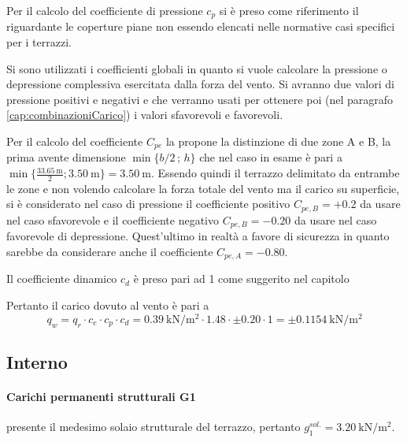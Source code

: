 Per il calcolo del coefficiente di pressione $c_p$ si è preso come riferimento il  riguardante le coperture piane non essendo elencati nelle normative casi specifici per i terrazzi.

Si sono utilizzati i coefficienti globali in quanto si vuole calcolare la pressione o depressione complessiva esercitata dalla forza del vento. 
Si avranno due valori di pressione positivi e negativi e che verranno usati per ottenere poi (nel paragrafo \ref{cap:combinazioniCarico}) i valori sfavorevoli e favorevoli.

Per il calcolo del coefficiente $C_{pe}$ la  propone la distinzione di due zone A e B, la prima avente dimensione $\min\{ b/2\,;\,h\}$ che nel caso in esame è pari a $\min\{\frac{\SI{33.65}{\meter}}{2};\SI{3.50}{\meter}\}=\SI{3.50}{\meter}$.
Essendo quindi il terrazzo delimitato da entrambe le zone e non volendo calcolare la forza totale del vento ma il carico su superficie, si è considerato nel caso di pressione il coefficiente positivo $C_{pe,B}=+0.2$ da usare nel caso sfavorevole e il coefficiente negativo $C_{pe,B}=-0.20$ da usare nel caso favorevole di depressione.
Quest'ultimo in realtà a favore di sicurezza in quanto sarebbe da considerare anche il coefficiente $C_{pe,A}=-0.80$.

Il coefficiente dinamico $c_d$ è preso pari ad 1 come suggerito nel capitolo 

Pertanto il carico dovuto al vento è pari a 
\begin{equation}
	q_w = q_r \cdot c_e \cdot c_p \cdot c_d = \SI{0.39}{\kilo\newton\per\square\meter}\cdot 1.48 \cdot \pm 0.20 \cdot 1= \pm \SI{0.1154}{\kilo\newton\per\square\meter}\label{eq:caricoVento}
\end{equation}
\subsection{Interno}
\paragraph*{Carichi permanenti strutturali G1}
\e presente il medesimo solaio strutturale del terrazzo, pertanto $g_1^{sol.}=\SI{3.20}{\kilo\newton\per\square\meter}$.
